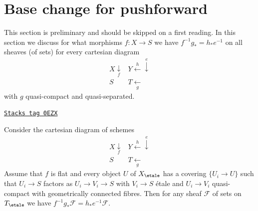\section{Base change for pushforward}
\label{etale-cohomology-section-base-change-f-star}
This section is preliminary and should be skipped on a first reading.
In this section we discuss for what morphisms $f : X \to S$ we have
$f^{-1}g_* = h_*e^{-1}$ on all sheaves (of sets) for every cartesian
diagram
$$
\begin{array}{cc}X \underset{f}{\downarrow} & Y \overset{h}{\longleftarrow}\overset{e}{\downarrow} \\ S & T \underset{g}{\longleftarrow}\end{array}
$$
with $g$ quasi-compact and quasi-separated.

\begin{lemma}
\label{etale-cohomology-lemma-base-change-f-star-general}
\href{https://stacks.math.columbia.edu/tag/0EZX}{\texttt{Stacks tag 0EZX}}

Consider the cartesian diagram of schemes
$$
\begin{array}{cc}X \underset{f}{\downarrow} & Y \overset{h}{\longleftarrow}\overset{e}{\downarrow} \\ S & T \underset{g}{\longleftarrow}\end{array}
$$
Assume that $f$ is flat and every object $U$ of $X_\etale$ has
a covering $\{U_i \to U\}$ such that $U_i \to S$
factors as $U_i \to V_i \to S$ with $V_i \to S$
\'etale and $U_i \to V_i$ quasi-compact with
geometrically connected fibres.
Then for any sheaf $\mathcal{F}$ of sets on $T_\etale$ we have
$f^{-1}g_*\mathcal{F} = h_*e^{-1}\mathcal{F}$.
\end{lemma}

